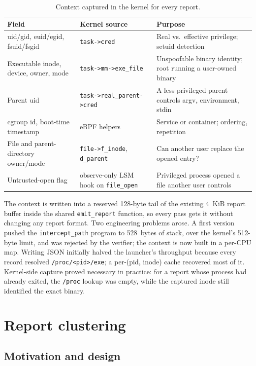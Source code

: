 \documentclass[11pt,a4paper]{article}
\newcommand{\pass}[1]{\texttt{#1}}
\begin{document}
\begin{table}[H]
\centering\small
\caption{Context captured in the kernel for every report.}
\label{tab:ctx}
\begin{tabularx}{\linewidth}{@{}l l X@{}}
\toprule
Field & Kernel source & Purpose \\
\midrule
uid/gid, euid/egid, fsuid/fsgid & \texttt{task->cred} & Real vs.\ effective privilege; setuid detection \\
Executable inode, device, owner, mode & \texttt{task->mm->exe\_file} & Unspoofable binary identity; root running a user-owned binary \\
Parent uid & \texttt{task->real\_parent->cred} & A less-privileged parent controls argv, environment, stdin \\
cgroup id, boot-time timestamp & eBPF helpers & Service or container; ordering, repetition \\
File and parent-directory owner/mode & \texttt{file->f\_inode}, \texttt{d\_parent} & Can another user replace the opened entry? \\
Untrusted-open flag & observe-only LSM hook on \texttt{file\_open} & Privileged process opened a file another user controls \\
\bottomrule
\end{tabularx}
\end{table}

The context is written into a reserved 128-byte tail of the existing 4~KiB report buffer inside the
shared \texttt{emit\_report} function, so every pass gets it without changing any report format.
Two engineering problems arose. A first version pushed the \pass{intercept\_path} program to
528~bytes of stack, over the kernel's 512-byte limit, and was rejected by the verifier; the context
is now built in a per-CPU map. Writing JSON initially halved the launcher's throughput because
every record resolved \texttt{/proc/<pid>/exe}; a per-(pid, inode) cache recovered most of it.
Kernel-side capture proved necessary in practice: for a report whose process had already exited,
the \texttt{/proc} lookup was empty, while the captured inode still identified the exact binary.

\section{Report clustering}
\label{sec:cluster}

\subsection{Motivation and design}
\end{document}
